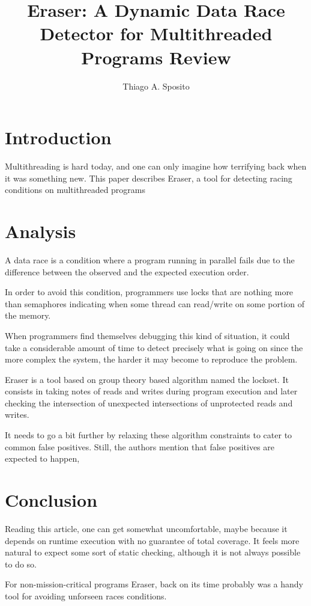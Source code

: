 \documentclass[12pt]{article}
\title{Eraser: A Dynamic Data Race Detector for Multithreaded Programs Review}
\author{Thiago A. Sposito\inst{1} }
\begin{document}
 

\maketitle


\section{Introduction}
Multithreading is hard today, and one can only imagine how terrifying back when it was something new. This paper describes Eraser, a tool for detecting racing conditions on multithreaded programs\cite{savage1997eraser}
\section{Analysis}
A data race is a condition where a program running in parallel fails due to the difference between the observed and the expected execution order.

In order to avoid this condition, programmers use locks that are nothing more than semaphores indicating when some thread can read/write on some portion of the memory.

When programmers find themselves debugging this kind of situation, it could take a considerable amount of time to detect precisely what is going on since the more complex the system, the harder it may become to reproduce the problem.

Eraser is a tool based on group theory based algorithm named the lockset. It consists in taking notes of reads and writes during program execution and later checking the intersection of unexpected intersections of unprotected reads and writes.

It needs to go a bit further by relaxing these algorithm constraints to cater to common false positives. Still, the authors mention that false positives are expected to happen,
\section{Conclusion}
Reading this article, one can get somewhat uncomfortable, maybe because it depends on runtime execution with no guarantee of total coverage. It feels more natural to expect some sort of static checking, although it is not always possible to do so.

For non-mission-critical programs Eraser, back on its time probably was a handy tool for avoiding unforseen races conditions.


\end{document}
